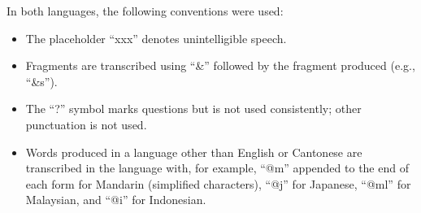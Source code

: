In both languages, the following conventions were used:
\begin{itemize}
 \item The placeholder ``xxx'' denotes unintelligible speech.
 \item Fragments are transcribed using ``\&'' followed by the fragment produced (e.g., ``\&s'').
 \item The ``?'' symbol marks questions but is not used consistently; other punctuation is not used.
\item Words produced in a language other than English or Cantonese are transcribed in the language with, for example, ``@m'' appended to the end of each form for Mandarin (simplified characters), ``@j'' for Japanese, ``@ml'' for Malaysian, and ``@i'' for Indonesian.

\end{itemize}

